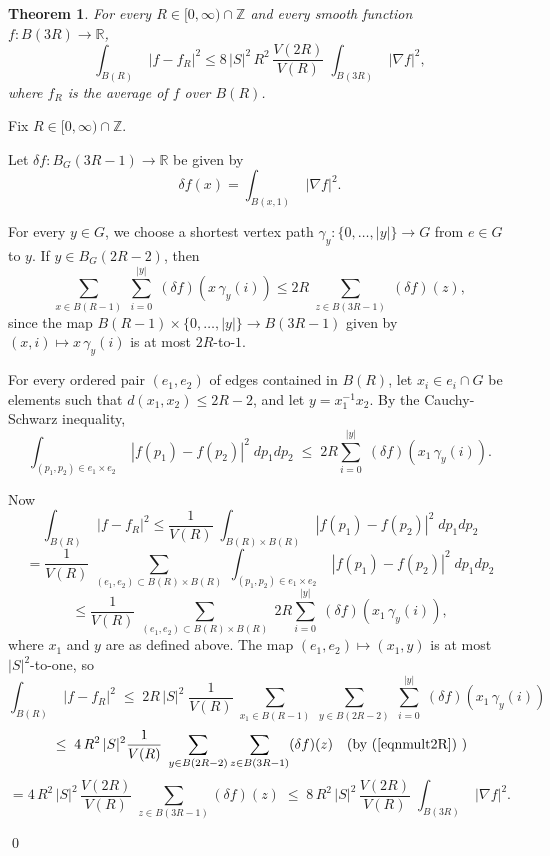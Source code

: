 \documentclass[12pt]{amsart}
\numberwithin{equation}{section}
\theoremstyle{plain}
\newtheorem{theorem}[equation]{Theorem}
\theoremstyle{remark}
\theoremstyle{definition}
\newcommand{\ra}{\rightarrow}
\newcommand{\R}{\mathbb R}
\newcommand{\Z}{\mathbb Z}
\def\de{\delta}
\def\ga{\gamma}
\def\ra{\rightarrow}
\begin{document}
\begin{theorem}
\label{thmpi}
For every $R\in [0,\infty)\cap \Z$ and every smooth function
$f:B(3R)\ra \R$,
\begin{equation}
\int_{B(R)}\;|f-f_R|^2
\leq 8\,|S|^2\,R^2\,\frac{V(2R)}{V(R)}\;
\int_{B(3R)}\;|\nabla f|^2,
\end{equation}
where $f_R$ is the average of $f$ over $B(R)$.
\end{theorem}
\proof
Fix $R\in [0,\infty)\cap \Z$.

Let $\de f:B_G(3R-1)\ra \R$ be given by
$$
\de f(x)=\int_{B(x,1)}\;|\nabla f|^2.
$$

For every $y\in G$, we choose a shortest vertex
path $\ga_y:\{0,\ldots,|y|\}\ra G$ from $e\in G$ to $y$.
If $y\in B_G(2R-2)$, then
\begin{equation}
\label{eqnmult2R}
\sum_{x\in B(R-1)}\;\sum_{i=0}^{|y|}\;(\de f)(x\,\ga_y(i))
\leq 2R\;\sum_{z\in B(3R-1)}\;(\de f)(z),
\end{equation}
since the map $B(R-1)\times\{0,\ldots,|y|\}\ra B(3R-1)$
given by $(x,i)\mapsto x\,\ga_y(i)$ is at most $2R$-to-$1$.

For every ordered pair $(e_1,e_2)$ 
of edges contained in $B(R)$, let $x_i\in e_i\cap G$
be elements such that $d(x_1,x_2)\leq 2R-2$, and let
$y=x_1^{-1}x_2$. 
By the Cauchy-Schwarz inequality,
\begin{equation}
\label{eqnp1p2}
\int_{(p_1,p_2)\in e_1\times e_2}\;|f(p_1)-f(p_2)|^2\;dp_1dp_2
\;\leq\; 2R\sum_{i=0}^{|y|}\;(\de f)(x_1\,\ga_y(i)).
\end{equation}

Now
$$
\int_{B(R)}\;|f-f_R|^2
\leq \frac{1}{V(R)}\;\int_{B(R)\times B(R)}\;|f(p_1)-f(p_2)|^2\;
dp_1dp_2
$$
$$
=
\frac{1}{V(R)}\;\sum_{(e_1,e_2)\subset B(R)\times B(R)}\;
\int_{(p_1,p_2)\in e_1\times e_2}\;
|f(p_1)-f(p_2)|^2\;dp_1dp_2
$$
$$
\leq \frac{1}{V(R)}\;\sum_{(e_1,e_2)\subset B(R)\times B(R)}\;
2R\sum_{i=0}^{|y|}\;(\de f)(x_1\,\ga_y(i)),
$$
where $x_1$ and $y$ are as defined above.
The map $(e_1,e_2)\mapsto (x_1,y)$ is at most $|S|^2$-to-one,
so
$$
\int_{B(R)}\;|f-f_R|^2
\;\leq\; 2R\,|S|^2\;\frac{1}{V(R)}\;\sum_{x_1\in B(R-1)}\;
\sum_{y\in B(2R-2)}\;\sum_{i=0}^{|y|}\;(\de f)(x_1\,\ga_y(i))
$$
$$
\;\leq\; 4\,R^2\,|S|^2\frac{1}{V(R)}\;
\sum_{y\in B(2R-2)}\sum_{z\in B(3R-1)}  (\de f)(z)
\quad\mbox{(by (\ref{eqnmult2R}) )}
$$
$$
=4\,R^2\,|S|^2\,\frac{V(2R)}{V(R)}\;
\sum_{z\in B(3R-1)}  (\de f)(z)
\;\leq\; 8\,R^2\,|S|^2\,\frac{V(2R)}{V(R)}\;
\int_{B(3R)}\;|\nabla f|^2.
$$

\qed
\end{document}
